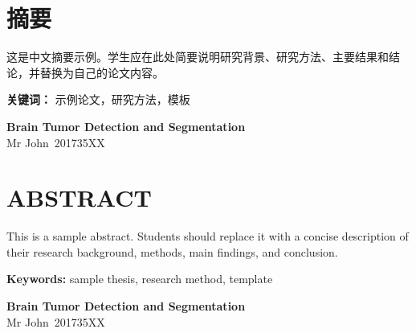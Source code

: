 \documentclass[12pt,fleqn]{report}
\newcommand{\thesistitle}{Brain Tumor Detection and Segmentation }
\newcommand{\studentname}{Mr John}
\newcommand{\studentid}{201735XX}
\begin{document}
\pagestyle{fancy}
\setcounter{page}{1}
\tableofcontents
\clearpage

\begingroup
\titleformat{\chapter}[block]{\Large\normalsize\bfseries\centering}{}{0pt}{}
\chapter*{摘要}
\vspace{1em}
这是中文摘要示例。学生应在此处简要说明研究背景、研究方法、主要结果和结论，并替换为自己的论文内容。

\vspace{1em}
\noindent\textbf{关键词：} 示例论文，研究方法，模板
\endgroup
\clearpage

\begingroup
\titleformat{\chapter}[block]{\Large\normalsize\bfseries\centering}{}{0pt}{}
\begin{center}
{\large\bfseries \thesistitle}\\[6pt]
{\small \studentname\ \studentid}
\end{center}
\vspace{0.8em}
\chapter*{ABSTRACT}
\vspace{1em}
\vspace{1em}
This is a sample abstract. Students should replace it with a concise description of their research background, methods, main findings, and conclusion.

\vspace{1em}
\textbf{Keywords:} sample thesis, research method, template
\endgroup
\vspace{2em}

\clearpage
\begin{center}
{\bfseries \thesistitle}\\[6pt]
{\small \studentname\ \studentid}
\end{center}
\vspace{6pt}
\end{document}

